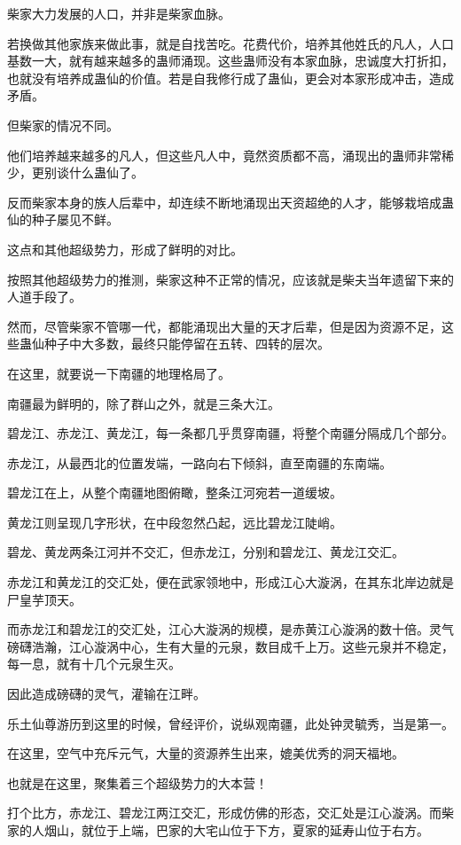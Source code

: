 \begin{this_body}
柴家大力发展的人口，并非是柴家血脉。

若换做其他家族来做此事，就是自找苦吃。花费代价，培养其他姓氏的凡人，人口基数一大，就有越来越多的蛊师涌现。这些蛊师没有本家血脉，忠诚度大打折扣，也就没有培养成蛊仙的价值。若是自我修行成了蛊仙，更会对本家形成冲击，造成矛盾。

但柴家的情况不同。

他们培养越来越多的凡人，但这些凡人中，竟然资质都不高，涌现出的蛊师非常稀少，更别谈什么蛊仙了。

反而柴家本身的族人后辈中，却连续不断地涌现出天资超绝的人才，能够栽培成蛊仙的种子屡见不鲜。

这点和其他超级势力，形成了鲜明的对比。

按照其他超级势力的推测，柴家这种不正常的情况，应该就是柴夫当年遗留下来的人道手段了。

然而，尽管柴家不管哪一代，都能涌现出大量的天才后辈，但是因为资源不足，这些蛊仙种子中大多数，最终只能停留在五转、四转的层次。

在这里，就要说一下南疆的地理格局了。

南疆最为鲜明的，除了群山之外，就是三条大江。

碧龙江、赤龙江、黄龙江，每一条都几乎贯穿南疆，将整个南疆分隔成几个部分。

赤龙江，从最西北的位置发端，一路向右下倾斜，直至南疆的东南端。

碧龙江在上，从整个南疆地图俯瞰，整条江河宛若一道缓坡。

黄龙江则呈现几字形状，在中段忽然凸起，远比碧龙江陡峭。

碧龙、黄龙两条江河并不交汇，但赤龙江，分别和碧龙江、黄龙江交汇。

赤龙江和黄龙江的交汇处，便在武家领地中，形成江心大漩涡，在其东北岸边就是尸皇芋顶天。

而赤龙江和碧龙江的交汇处，江心大漩涡的规模，是赤黄江心漩涡的数十倍。灵气磅礴浩瀚，江心漩涡中心，生有大量的元泉，数目成千上万。这些元泉并不稳定，每一息，就有十几个元泉生灭。

因此造成磅礴的灵气，灌输在江畔。

乐土仙尊游历到这里的时候，曾经评价，说纵观南疆，此处钟灵毓秀，当是第一。

在这里，空气中充斥元气，大量的资源养生出来，媲美优秀的洞天福地。

也就是在这里，聚集着三个超级势力的大本营！

打个比方，赤龙江、碧龙江两江交汇，形成仿佛的形态，交汇处是江心漩涡。而柴家的人烟山，就位于上端，巴家的大宅山位于下方，夏家的延寿山位于右方。


\end{this_body}
